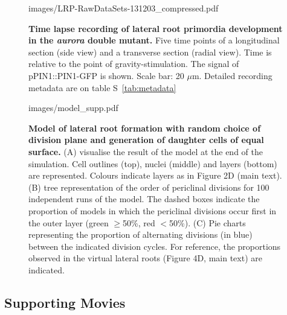 \documentclass[11pt,a4paper, final]{article}
\begin{document}
%
\begin{figure}[htbp]
	\begin{overpic}[width=1.\linewidth]{images/LRP-RawDataSets-131203_compressed.pdf}
	\end{overpic}
\caption[ Time lapse recording of lateral root primordia development in the \emph{aurora} double mutant.]
{{\bf Time lapse recording of lateral root primordia development in the \emph{aurora} double mutant.} Five time points of a longitudinal section (side view) and a transverse section (radial view). Time is relative to the point of gravity-stimulation. The signal of pPIN1::PIN1-GFP is shown. Scale bar: 20 $\mu$m. Detailed recording metadata are on table S~\ref{tab:metadata}}
\label{fig:aurora}
\end{figure}
%
\clearpage
%
\begin{figure}[htbp]
	\begin{overpic}[width=1.\linewidth]{images/model_supp.pdf}
	\end{overpic}
\caption[Model of lateral root formation with random choice of division plane and generation of daughter cells of equal surface.]
{{\bf Model of lateral root formation with random choice of division plane and generation of daughter cells of equal surface.} (A) visualise the result of the model at the end of the simulation. Cell outlines (top), nuclei (middle) and layers (bottom) are represented. Colours indicate layers as in Figure 2D (main text). (B) tree representation of the order of periclinal divisions for 100 independent runs of the model. The dashed boxes indicate the proportion of models in which the periclinal divisions occur first in the outer layer (green $\geqslant$50\%, red $<$50\%). (C) Pie charts representing the proportion of alternating divisions (in blue) between the indicated division cycles. For reference, the proportions observed in the virtual lateral roots (Figure 4D, main text) are indicated. }
\label{fig:suppmodel}
\end{figure}
%

\clearpage
\subsection{Supporting Movies}
\label{sec:suppmovies}
\end{document}
